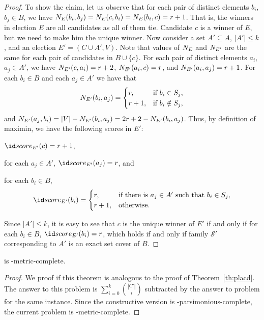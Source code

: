 \begin{proof}
To show the claim, let us observe that for each pair of distinct elements $b_i$, $b_j\in B$, we have $N_{E}(b_i,b_j)=N_{E}(c,b_i)=N_{E}(b_i,c)=r+1$.
That is, the winners in election $E$ are all candidates as all of them tie.
Candidate $c$ is a winner of $E$, but we need to make him the unique winner.
Now consider a set $A'\subseteq A$, $|A'|\le k$, and an election $E'=(C\cup A',V)$.
Note that values of $N_{E}$ and $N_{E'}$ are the same for each pair of candidates in $B\cup\{c\}$.
For each pair of distinct elements $a_i$, $a_j\in A'$, we have $N_{E'}(c,a_i)=r+2$, $N_{E'}(a_i,c)=r$, and $N_{E'}(a_i,a_j)=r+1$.
For each $b_i\in B$ and each $a_j\in A'$ we have that
\[
	N_{E'}(b_i,a_j) =
	\begin{cases}
		r, & \text{if $b_i\in S_j$}, \\
		r+1, & \text{if $b_i\notin S_j$},
	\end{cases}
\]
and $N_{E'}(a_j,b_i)=|V|-N_{E'}(b_i,a_j)=2r+2-N_{E'}(b_i,a_j)$.
Thus, by definition of maximin, we have the following scores in $E'$:
\begin{Enumerate}
	\item $\score{E'}(c)=r+1$,
	\item for each $a_j\in A'$, $\score{E'}(a_j)=r$, and
	\item for each $b_i\in B$,
	\[
		\score{E'}(b_i) =
		\begin{cases}
			r, & \text{if there is $a_j\in A'$ such that $b_i\in S_j$}, \\
			r+1, & \text{otherwise}.
		\end{cases}
	\]
\end{Enumerate}

Since $|A'|\le k$, it is easy to see that $c$ is the unique winner of $E'$ if and only if for each $b_i\in B$, $\score{E'}(b_i)=r$, which holds if and only if family $\mathcal{S'}$ corresponding to $A'$ is an exact set cover of $B$.
\end{proof}

\begin{theorem} \label{th:mmacd}
	 is \sharpPclass-metric-complete.
\end{theorem}

\begin{proof}
We proof if this theorem is analogous to the proof of Theorem~\ref{th:placd}.
The answer to this problem is $\sum_{i=0}^k\binom{|C'|}{i}$ subtracted by the answer to problem  for the same instance.
Since the constructive version is \sharpPclass-parsimonious-complete, the current problem is \sharpPclass-metric-complete.
\end{proof}

